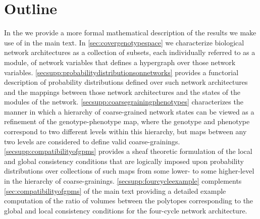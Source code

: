 
\section{Outline}\label{secsupp:outline}
In the  we provide a more formal mathematical description of the results we make use of in the main text. In \autoref{sec:covergenotypespace} we characterize biological network architectures as a collection of subsets, each individually referred to as a module, of network variables that defines a hypergraph over those network variables. \autoref{secsupp:probabilitydistributionsonnetworks} provides a functorial description of probability distributions defined over such network architectures and the mappings between those network architectures and the states of the modules of the network. \autoref{secsupp:coarsegrainingphenotypes} characterizes the manner in which a hierarchy of coarse-grained network states can be viewed as a refinement of the genotype-phenotype map, where the genotype and phenotype correspond to two different levels within this hierarchy, but maps between any two levels are considered to define valid coarse-grainings. \autoref{secsupp:compatibilityofgpms} provides a sheaf theoretic formulation of the local and global consistency conditions that are logically imposed upon probability distributions over collections of such maps from some lower- to some higher-level in the hierarchy of coarse-grainings. \autoref{secsupp:fourcycleexample} complements \autoref{sec:compatibilityofgpms} of the main text providing a detailed example computation of the ratio of volumes between the polytopes corresponding to the global and local consistency conditions for the four-cycle network architecture.

